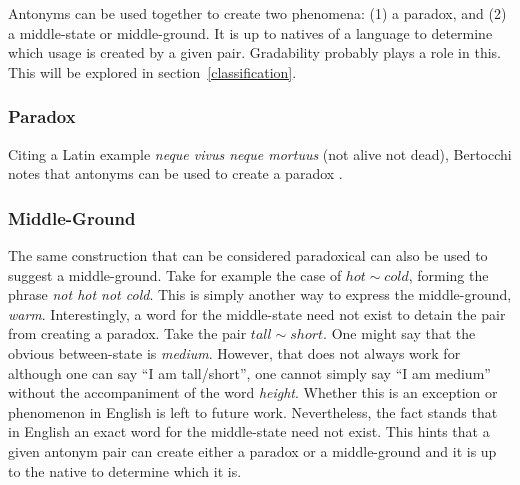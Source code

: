 Antonyms can be used together to create two phenomena: (1) a paradox, and (2) a middle-state or middle-ground.  It is up to natives of a language to determine which usage is created by a given pair.  Gradability probably plays a role in this.  This will be explored in section~\ref{classification}.

\subsubsection{Paradox}
Citing a Latin example \textit{neque vivus neque mortuus} (not alive not dead), Bertocchi notes that antonyms can be used to create a paradox \cite{Bertocchi}.  

\subsubsection{Middle-Ground}
The same construction that can be considered paradoxical can also be used to suggest a middle-ground.  Take for example the case of $hot\sim cold$, forming the phrase \textit{not hot not cold}.  This is simply another way to express the middle-ground, \textit{warm}.  Interestingly, a word for the middle-state need not exist to detain the pair from creating a paradox.  Take the pair $tall\sim short$.  One might say that the obvious between-state is \textit{medium}.  However, that does not always work for although one can say ``I am tall/short'', one cannot simply say ``I am medium'' without the accompaniment of the word \textit{height}.  Whether this is an exception or phenomenon in English is left to future work.  Nevertheless, the fact stands that in English an exact word for the middle-state need not exist.  This hints that a given antonym pair can create either a paradox or a middle-ground and it is up to the native to determine which it is.  


